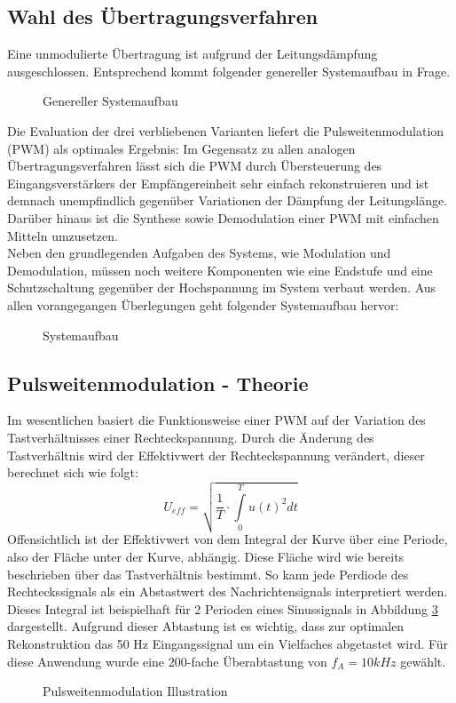 \subsection{Wahl des Übertragungsverfahren}
Eine unmodulierte Übertragung ist aufgrund der Leitungsdämpfung ausgeschlossen. Entsprechend kommt folgender genereller Systemaufbau in Frage.
\begin{figure}[H]
\centering
  
  \caption{Genereller Systemaufbau}
  \label{fig:psystem}
\end{figure}
Die Evaluation der drei verbliebenen Varianten liefert die Pulsweitenmodulation (PWM) als optimales Ergebnis:
Im Gegensatz zu allen analogen Übertragungsverfahren lässt sich die PWM durch Übersteuerung des Eingangsverstärkers der Empfängereinheit sehr einfach rekonstruieren und ist demnach unempfindlich gegenüber Variationen der Dämpfung der Leitungslänge. Darüber hinaus ist die Synthese sowie Demodulation einer PWM mit einfachen Mitteln umzusetzen.\\
Neben den grundlegenden Aufgaben des Systems, wie Modulation und Demodulation, müssen noch weitere Komponenten wie eine Endstufe und eine Schutzschaltung gegenüber der Hochspannung im System verbaut werden. 
Aus allen vorangegangen Überlegungen geht folgender Systemaufbau hervor: 
\begin{figure}[H]
  \centering
  
  \caption{Systemaufbau}
  \label{fig:system}
\end{figure}

\subsection{Pulsweitenmodulation - Theorie}
\label{sec:pwmTheory}
Im wesentlichen basiert die Funktionsweise einer PWM auf der Variation des Tastverhältnisses einer Rechteckspannung. Durch die Änderung des Tastverhältnis wird der Effektivwert der Rechteckspannung verändert, dieser berechnet sich wie folgt:\\
\begin{equation}
 U_{eff} = \sqrt{\frac{1}{T}\cdot\int\limits_{0}^T u(t)^2 dt}
\end{equation}
Offensichtlich ist der Effektivwert von dem Integral der Kurve über eine Periode, also der Fläche unter der Kurve, abhängig. Diese Fläche wird wie bereits beschrieben über das Tastverhältnis bestimmt. So kann jede Perdiode des Rechteckssignals als ein Abstastwert des Nachrichtensignals interpretiert werden. Dieses Integral ist beispielhaft für 2 Perioden eines Sinussignals in Abbildung \ref{fig:pwmArea} dargestellt. Aufgrund dieser Abtastung ist es wichtig, dass zur optimalen Rekonstruktion das 50 Hz Eingangssignal um ein Vielfaches abgetastet wird. Für diese Anwendung wurde eine 200-fache Überabtastung von $f_A=10kHz$ gewählt.
\begin{figure}[H]
  \centering
   \scalebox{0.6}{\begin{Large}
   
   \end{Large}}
   \caption{Pulsweitenmodulation Illustration}
  \label{fig:pwmArea}
\end{figure}

\newpage
